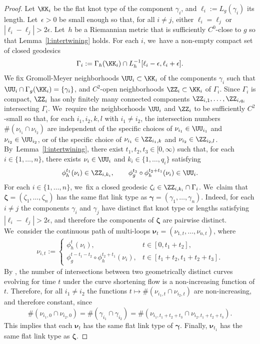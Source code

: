 \begin{proof}
Let $\KK_i$ be the flat knot type of the component $\gamma_i$, and $\ell_i:=L_g(\gamma_i)$ its length. Let~$\epsilon>0$ be small enough so that, for all $i\neq j$, either $\ell_i=\ell_j$ or $|\ell_i-\ell_j|>2\epsilon$. Let~$h$ be a Riemannian metric that is sufficiently $C^0$-close to $g$ so that Lemma~\ref{l:intertwining} holds. For each $i$, we~have a non-empty compact set of closed geodesics
\[
\Gamma_i:=\Gamma_h(\KK_i)\cap L_h^{-1}[\ell_i-\epsilon,\ell_i+\epsilon].
\]
We fix Gromoll-Meyer neighborhoods $\UU_i\subset\KK_i$ of the components $\gamma_i$ such that $\UU_i\cap\nobreak\Gamma_g(\KK_i)=\{\gamma_i\}$, and $C^2$-open neighborhoods $\ZZ_{i}\subset\KK_i$ of $\Gamma_i$.
Since $\Gamma_i$ is compact, $\ZZ_i$ has only finitely many connected components $\ZZ_{i,1},\dots,\ZZ_{i,q_i}$ intersecting $\Gamma_i$. We~require the neighborhoods $\UU_i$ and $\ZZ_i$ to be sufficiently $C^2$-small so that, for each $i_1,i_2,k,l$ with $i_1\neq i_2$, the intersection numbers $\#(\nu_{i_1}\cap\nu_{i_2})$ are independent of the specific choices of $\nu_{i_1}\in\UU_{i_1}$ and $\nu_{i_2}\in\UU_{i_2}$, or of the specific choice of $\nu_{i_1}\in\ZZ_{i_1,k}$ and $\nu_{i_2}\in\ZZ_{i_2,l}$. By~Lemma~\ref{l:intertwining}, there exist $t_1,t_2,t_3\in[0,\infty)$ such that, for each $i\in\{1,\dots,n\}$, there exists $\nu_i\in\UU_i$ and $k_i\in\{1,\dots,q_i\}$ satisfying
\begin{align*}
\phi_h^{t_1}(\nu_i)\in\ZZ_{i,k_i},
\qquad
\phi_g^{t_3}\circ\phi_h^{t_2+t_1}(\nu_i)\in\UU_i.
\end{align*}
For each $i\in\{1,\dots,n\}$, we~fix a closed geodesic $\zeta_i\in \ZZ_{i,k_i}\cap\Gamma_i$. We~claim that $\bm\zeta=(\zeta_{1},\dots,\zeta_{n})$ has the same flat link type as $\bm\gamma=(\gamma_1,\dots,\gamma_n)$. Indeed, for each $i\neq j$ the components $\gamma_i$ and $\gamma_j$ have distinct flat knot type or lengths satisfying $|\ell_i-\ell_j|>2\epsilon$, and therefore the components of $\bm\zeta$ are pairwise distinct. We~consider the continuous path of multi-loops $\bm\nu_t=(\nu_{1,t},\dots,\nu_{n,t})$, where
\begin{align*}
\nu_{i,t}
:=
\begin{cases}
\phi_h^t(\nu_i), & t\in[0,t_1+t_2],  \\
\phi_g^{t-t_1-t_2}\circ\phi_h^{t_2+t_1}(\nu_i), & t\in[t_1+t_2,t_1+t_2+t_3].
\end{cases}
\end{align*}
By \cite[Lem.\,3.3]{Angenent:2005aa}, the number of intersections between two geometrically distinct curves evolving for time $t$ under the curve shortening flow is a non-increasing function of $t$. Therefore, for all $i_1\neq i_2$ the functions $t\mapsto\#(\nu_{i_1,t}\cap\nu_{i_2,t})$ are non-increasing, and therefore constant, since
\[
\#(\nu_{i_1,0}\cap\nu_{i_2,0})
=
\#(\gamma_{i_1}\cap\gamma_{i_2})
=
\#(\nu_{i_1,t_1+t_2+t_3}\cap\nu_{i_2,t_1+t_2+t_3}).
\]
This implies that each $\bm\nu_t$ has the same flat link type of $\bm\gamma$. Finally, $\bm\nu_{t_1}$ has the same flat link type as $\bm\zeta$.
\end{proof}

